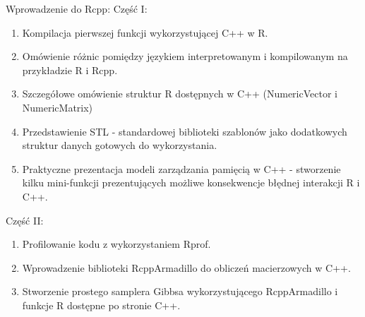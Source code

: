 \documentclass[\main/boa.tex]{subfiles}
\begin{document}
\planwarsztatu 
Wprowadzenie do Rcpp: Część I:
\begin{enumerate}
\item Kompilacja pierwszej funkcji wykorzystującej C++ w R.
\item Omówienie różnic pomiędzy językiem interpretowanym i kompilowanym na przykładzie R i Rcpp.
\item Szczegółowe omówienie struktur R dostępnych w C++ (NumericVector i NumericMatrix)
\item Przedstawienie STL - standardowej biblioteki szablonów jako dodatkowych struktur danych gotowych do wykorzystania.
\item Praktyczne prezentacja modeli zarządzania pamięcią w C++ - stworzenie kilku mini-funkcji prezentujących możliwe konsekwencje błędnej interakcji R i C++.
\end{enumerate}	 
Część II:
\begin{enumerate}
\item Profilowanie kodu z wykorzystaniem Rprof.
\item Wprowadzenie biblioteki RcppArmadillo do obliczeń macierzowych w C++.
\item Stworzenie prostego samplera Gibbsa wykorzystującego RcppArmadillo i funkcje R dostępne po stronie C++.
\end{enumerate}
\end{document}
